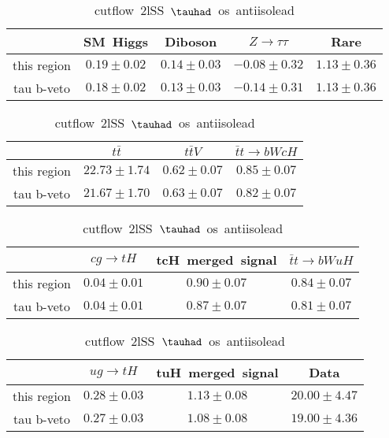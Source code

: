 \begin{table}
\footnotesize
\caption{cutflow~2lSS~$\tauhad$~os~antiisolead}
\centering
\begin{tabular}{|c|c|c|c|c|} \hline
 & SM~Higgs & Diboson & $Z\to \tau\tau$ & Rare\\\hline
this region & $0.19\pm0.02$ & $0.14\pm0.03$ & $-0.08\pm0.32$ & $1.13\pm0.36$\\\hline
tau b-veto & $0.18\pm0.02$ & $0.13\pm0.03$ & $-0.14\pm0.31$ & $1.13\pm0.36$\\\hline
\end{tabular}
\begin{tabular}{|c|c|c|c|} \hline
 & $t\bar{t}$ & $t\bar{t}V$ & $\bar{t}t\to bWcH$\\\hline
this region & $22.73\pm1.74$ & $0.62\pm0.07$ & $0.85\pm0.07$\\\hline
tau b-veto & $21.67\pm1.70$ & $0.63\pm0.07$ & $0.82\pm0.07$\\\hline
\end{tabular}
\begin{tabular}{|c|c|c|c|} \hline
 & $cg\to tH$ & tcH~merged~signal & $\bar{t}t\to bWuH$\\\hline
this region & $0.04\pm0.01$ & $0.90\pm0.07$ & $0.84\pm0.07$\\\hline
tau b-veto & $0.04\pm0.01$ & $0.87\pm0.07$ & $0.81\pm0.07$\\\hline
\end{tabular}
\begin{tabular}{|c|c|c|c|} \hline
 & $ug\to tH$ & tuH~merged~signal & Data\\\hline
this region & $0.28\pm0.03$ & $1.13\pm0.08$ & $20.00\pm4.47$\\\hline
tau b-veto & $0.27\pm0.03$ & $1.08\pm0.08$ & $19.00\pm4.36$\\\hline
\end{tabular}
\label{tab:cutflow_reg2lSS1tau1bnj_os_antiisolead}
\end{table}
